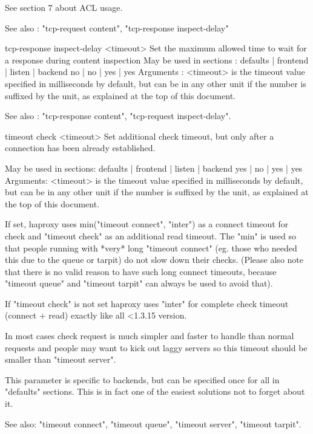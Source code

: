   See section 7 about ACL usage.

  See also : "tcp-request content", "tcp-response inspect-delay"


tcp-response inspect-delay <timeout>
  Set the maximum allowed time to wait for a response during content inspection
  May be used in sections :   defaults | frontend | listen | backend
                                 no    |    no    |   yes  |   yes
  Arguments :
    <timeout> is the timeout value specified in milliseconds by default, but
              can be in any other unit if the number is suffixed by the unit,
              as explained at the top of this document.

  See also : "tcp-response content", "tcp-request inspect-delay".


timeout check <timeout>
  Set additional check timeout, but only after a connection has been already
  established.

  May be used in sections:    defaults | frontend | listen | backend
                                 yes   |    no    |   yes  |   yes
  Arguments:
    <timeout> is the timeout value specified in milliseconds by default, but
              can be in any other unit if the number is suffixed by the unit,
              as explained at the top of this document.

  If set, haproxy uses min("timeout connect", "inter") as a connect timeout
  for check and "timeout check" as an additional read timeout. The "min" is
  used so that people running with *very* long "timeout connect" (eg. those
  who needed this due to the queue or tarpit) do not slow down their checks.
  (Please also note that there is no valid reason to have such long connect
  timeouts, because "timeout queue" and "timeout tarpit" can always be used to
  avoid that).

  If "timeout check" is not set haproxy uses "inter" for complete check
  timeout (connect + read) exactly like all <1.3.15 version.

  In most cases check request is much simpler and faster to handle than normal
  requests and people may want to kick out laggy servers so this timeout should
  be smaller than "timeout server".

  This parameter is specific to backends, but can be specified once for all in
  "defaults" sections. This is in fact one of the easiest solutions not to
  forget about it.

  See also: "timeout connect", "timeout queue", "timeout server",
            "timeout tarpit".


